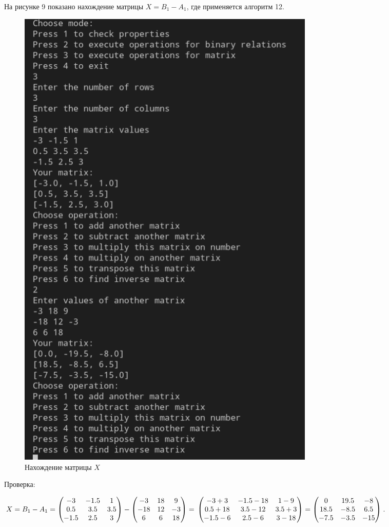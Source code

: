 \documentclass[bachelor, och, labwork]{shiza}
\begin{document}
        На рисунке 9 показано нахождение матрицы $X = B_1 - A_1$, где применяется алгоритм 12.

        \begin{figure}[H]
            \centering
            \includegraphics[width=0.7\textwidth]{photo/9.png}
            \caption{Нахождение матрицы $X$}
        \end{figure}

        Проверка:

        $X = B_1 - A_1=
        \begin{pmatrix}
            -3 & -1.5 & 1  \\
            0.5 & 3.5 & 3.5 \\
            -1.5 & 2.5 & 3
        \end{pmatrix} -
        \begin{pmatrix}
            -3 & 18 & 9  \\
            -18 & 12 & -3 \\
            6 & 6 & 18
        \end{pmatrix} = \\
        \begin{pmatrix}
            -3 + 3 & -1.5 - 18 & 1 - 9  \\
            0.5 + 18 & 3.5 - 12 & 3.5 + 3 \\
            -1.5 - 6 & 2.5 - 6 & 3 - 18
        \end{pmatrix} =
        \begin{pmatrix}
            0 & 19.5 & -8  \\
            18.5 & -8.5 & 6.5 \\
            -7.5 & -3.5 & -15
        \end{pmatrix}$.
        
\end{document}
